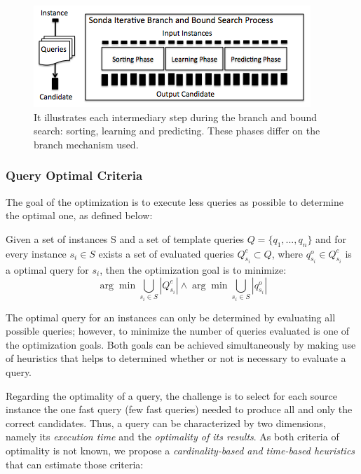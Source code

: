 \begin{figure} [h]
\vspace{-10pt}
\centering
\includegraphics[scale=0.5]{p24.png}
\caption{It illustrates each intermediary step during the branch and bound search: sorting, learning and predicting. These phases differ on the branch mechanism used. } 
\vspace{-10pt}
\label{fig:branch}
\end{figure}

\subsubsection{Query Optimal Criteria} 

The goal of the optimization is to execute less queries as possible to determine the optimal one, as defined below:
\begin{definition} Given a set of instances S and a set of template queries $Q =\{q_1,..., q_n\}$ and for every instance $s_i \in S$ exists a set of evaluated queries $Q^e_{s_i} \subset Q$, where $q^o_{s_i} \in Q^e_{s_i}$ is a optimal query for $s_i$, then the optimization goal is to minimize:
\[
{\arg \min} \bigcup_{s_i \in S}|Q^e_{s_i}| \land
{\arg \min} \bigcup_{s_i \in S} |q^o_{s_i}| 
\]
\end{definition} 

The optimal query for an instances can only be determined by evaluating all possible queries; however, to minimize the number of queries evaluated is one of the optimization goals. Both goals can be achieved simultaneously by making use of heuristics that helps to determined whether or not is necessary to evaluate a query.

Regarding the optimality of a query, the challenge is to select for each source instance the one fast query (few fast queries) needed to produce all and only the correct candidates. Thus, a query can be characterized by two dimensions, namely its \emph{execution time} and the \emph{optimality of its results}. As both criteria of optimality is not known, we propose a \emph{cardinality-based and time-based heuristics} that can estimate those criteria:


